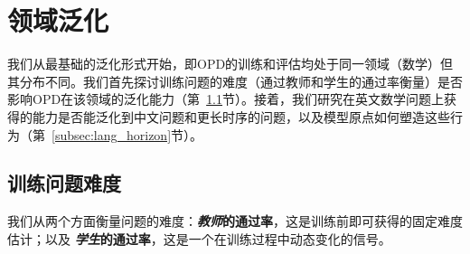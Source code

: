 \section{领域泛化}
我们从最基础的泛化形式开始，即OPD的训练和评估均处于同一领域（数学）但其分布不同。我们首先探讨训练问题的难度（通过教师和学生的通过率衡量）是否影响OPD在该领域的泛化能力（第~\ref{subsec:difficulty}节）。接着，我们研究在英文数学问题上获得的能力是否能泛化到中文问题和更长时序的问题，以及模型原点如何塑造这些行为（第~\ref{subsec:lang_horizon}节）。

\subsection{训练问题难度}
\label{subsec:difficulty}
我们从两个方面衡量问题的难度：\textbf{\emph{教师}的通过率}，这是训练前即可获得的固定难度估计；以及 \textbf{\emph{学生}的通过率}，这是一个在训练过程中动态变化的信号。
